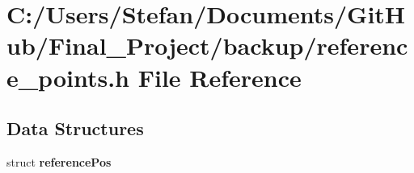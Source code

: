 \section{C\-:/\-Users/\-Stefan/\-Documents/\-Git\-Hub/\-Final\-\_\-\-Project/backup/reference\-\_\-points.h File Reference}
\label{backup_2reference__points_8h}
\subsection*{Data Structures}
\begin{DoxyCompactItemize}
\item 
struct {\bf reference\-Pos}
\end{DoxyCompactItemize}
